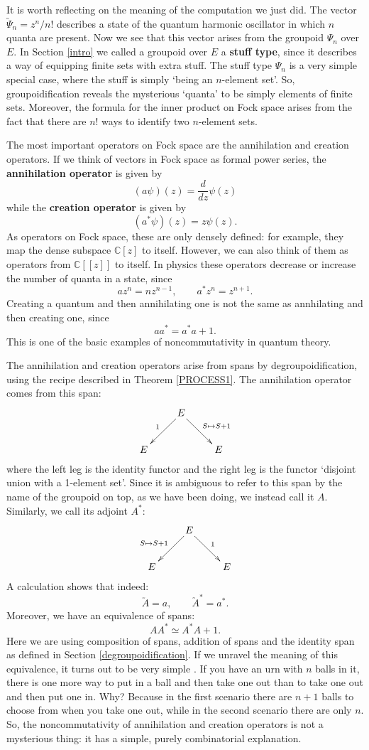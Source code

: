 \documentclass{article}
\newcommand{\C}{{\mathbb C}}
\begin{document}
It is worth reflecting on the meaning of the computation we just did.
The vector $\utilde{\Psi}_n = z^n/n!$ describes a state of the quantum
harmonic oscillator in which $n$ quanta are present.  Now we see that
this vector arises from the groupoid $\Psi_n$ over $E$.  In Section
\ref{intro} we called a groupoid over $E$ a {\bf stuff type}, since it
describes a way of equipping finite sets with extra stuff.  The stuff
type $\Psi_n$ is a very simple special case, where the stuff is simply
`being an $n$-element set'.  So, groupoidification reveals the
mysterious `quanta' to be simply elements of finite sets.  Moreover,
the formula for the inner product on Fock space arises from the fact
that there are $n!$ ways to identify two $n$-element sets.

The most important operators on Fock space are the annihilation and
creation operators.  If we think of vectors in Fock space as formal
power series, the {\bf annihilation operator} is given by
\[        (a \psi)(z) = \frac{d}{dz} \psi(z)   \]
while the {\bf creation operator} is given by
\[        (a^* \psi)(z) = z \psi(z)  .\]
As operators on Fock space, these are only densely defined: for example,
they map the dense subspace $\C[z]$ to itself.  However, we can also think 
of them as operators from $\C[[z]]$ to itself.  In physics these 
operators decrease or increase the number of quanta in a state, since
\[        az^n = n z^{n-1}  , \qquad a^* z^n = z^{n+1}.\]
Creating a quantum and then annihilating one is not the same as 
annhilating and then creating one, since
\[        a a^* = a^* a + 1  .\]
This is one of the basic examples of noncommutativity in quantum theory.

The annihilation and creation operators arise from spans by 
degroupoidification, using the recipe described in Theorem 
\ref{PROCESS1}.  The annihilation operator comes from this span:
\[
\xymatrix{
& E\ar[dl]_{1} \ar[dr]^{S \mapsto S+1} & \\
E & & E
}
\]
where the left leg is the identity functor and the right leg is the
functor `disjoint union with a 1-element set'.  Since it is ambiguous
to refer to this span by the name of the groupoid on top, as we have
been doing, we instead call it $A$.  Similarly, we call its adjoint
$A^*$:
\[
\xymatrix{
& E\ar[dl]_{S \mapsto S+1} \ar[dr]^{1} & \\
E & & E
}
\]
A calculation \cite{Morton:2006} shows that indeed:
\[         \utilde{A} = a, \qquad \utilde{A}^* = a^*  .\]
Moreover, we have an equivalence of spans:
\[           AA^* \simeq A^*A + 1 . \]
Here we are using composition of spans, addition of spans and the
identity span as defined in Section \ref{degroupoidification}.  If we
unravel the meaning of this equivalence, it turns out to be very
simple \cite{BaezDolan:2001}.  If you have an urn with $n$ balls in
it, there is one more way to put in a ball and then take one out than
to take one out and then put one in.  Why?  Because in the first
scenario there are $n+1$ balls to choose from when you take one out,
while in the second scenario there are only $n$.  So, the
noncommutativity of annihilation and creation operators is not a
mysterious thing: it has a simple, purely combinatorial explanation.
\end{document}
